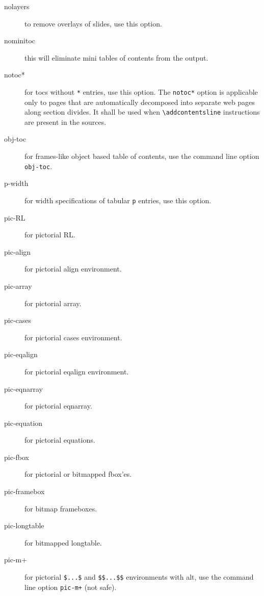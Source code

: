 \documentclass[a4paper]{article}
\begin{document}
\begin{description}
\item[nolayers] to remove overlays of slides, use this option.

\item[nominitoc] this will eliminate mini tables of contents from the
  output.

\item[notoc*] for tocs without \verb=*= entries, use this option. The
  \verb=notoc*= option is applicable only to pages that are
  automatically decomposed into separate web pages along section
  divides. It shall be used when \verb=\addcontentsline= instructions
  are present in the sources.

\item[obj-toc] for frames-like object based table of contents, use the
  command line option \verb=obj-toc=.


\item[p-width] for width specifications of tabular \verb=p= entries,
  use this option.

\item[pic-RL] for pictorial RL.

\item[pic-align] for pictorial align environment.

\item[pic-array] for pictorial array.

\item[pic-cases] for pictorial cases environment.

\item[pic-eqalign] for pictorial eqalign environment.

\item[pic-eqnarray] for pictorial eqnarray.

\item[pic-equation] for pictorial equations.

\item[pic-fbox] for pictorial or bitmapped fbox'es.

\item[pic-framebox] for bitmap frameboxes.

\item[pic-longtable] for bitmapped longtable.

\item[pic-m+] for pictorial \verb=$...$= and \verb=$$...$$=
  environments with \latex alt, use the command line option
  \verb=pic-m+= (not safe).


\end{description}
\end{document}
